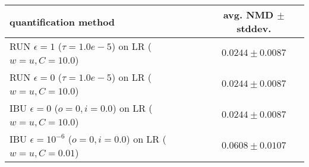 \begin{tabular}{lc}
  \toprule
  quantification method & avg. NMD $\pm$ stddev. \\
  \midrule
  RUN $\epsilon=1$ ($\tau=1.0e-5$) on LR ($w=u, C=10.0$) & $\mathbf{0.0244 \pm 0.0087}$ \\
  RUN $\epsilon=0$ ($\tau=1.0e-5$) on LR ($w=u, C=10.0$) & $0.0244 \pm 0.0087$ \\
  IBU $\epsilon=0$ ($o=0, i=0.0$) on LR ($w=u, C=10.0$) & $0.0244 \pm 0.0087$ \\
  IBU $\epsilon=10^{-6}$ ($o=0, i=0.0$) on LR ($w=u, C=0.01$) & $0.0608 \pm 0.0107$ \\
  \bottomrule
\end{tabular}
